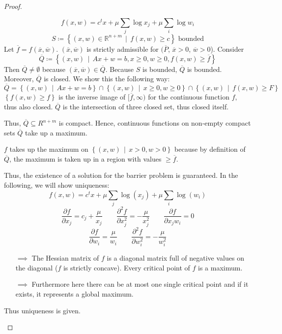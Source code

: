 \documentclass[a4paper]{article}
\numberwithin{lecref}{section}
\newcommand{\Set}[1]{\left\{#1\right\}}
\newcommand{\SetDef}[2]{\left\{#1\,\mid\,#2\right\}}
\begin{document}
\begin{proof}
\begin{description}
			\[ f(x, w) = c^t x + \mu \sum_j \log x_j + \mu \sum_i \log w_i \]
			\[ S \coloneqq \SetDef{(x, w) \in \mathbb R^{n + m}}{f(x, w) \geq c} \text{ bounded} \]
			Let $\overline f = f(\overline x, \overline w)$. $(\overline x, \overline w)$ is strictly admissible for $(\overline P$, $\overline x > 0$, $\overline w > 0$).
			Consider
			\[ \overline Q \coloneqq \SetDef{(x, w)}{Ax + w = b, x \geq 0, w \geq 0, f(x, w) \geq \overline f} \]
			Then $\overline Q \neq \emptyset$ because $(\overline x, \overline w) \in \overline Q$. Because $S$ is bounded, $\overline Q$ is bounded.
			Moreover, $\overline Q$ is closed. We show this the following way:
			\[ \overline Q = \SetDef{(x, w)}{Ax + w = b} \cap \SetDef{(x, w)}{x \geq 0, w \geq 0} \cap \SetDef{(x, w)}{f(x, w) \geq F} \]
			$\Set{f(x, w) \geq f}$ is the inverse image of $[\overline f, \infty)$ for the continuous function $f$, thus also closed.
			$\overline Q$ is the intersection of three closed set, thus closed itself.

			Thus, $\overline Q \subseteq R^{n + m}$ is compact.
			Hence, continuous functions on non-empty compact sets $\overline Q$ take up a maximum.

			$f$ takes up the maximum on $\SetDef{(x, w)}{x > 0, w > 0}$ because by definition of $\overline Q$, the maximum is taken up in a region with values $\geq \overline f$.

			Thus, the existence of a solution for the barrier problem is guaranteed.
			In the following, we will show uniqueness:
			\[ f(x, w) = c^t x + \mu \sum_j \log(x_j) + \mu \sum_i \log(w_i) \]
			\[ \frac{\partial f}{\partial x_j} = c_j + \frac{\mu}{x_j}  \qquad  \frac{\partial^2 f}{\partial x_j^2} = -\frac{\mu}{x_j^2} \qquad \frac{\partial f}{\partial x_j w_i} = 0 \]
			\[ \frac{\partial f}{\partial w_i} = \frac{\mu}{w_i} \qquad \frac{\partial^2 f}{\partial w_i^2} = -\frac{\mu}{w_i^2} \]
			\begin{itemize}
				\item[$\implies$] The Hessian matrix of $f$ is a diagonal matrix full of negative values on the diagonal ($f$ is strictly concave). Every critical point of $f$ is a maximum.
				\item[$\implies$] Furthermore here there can be at most one single critical point and if it exists, it represents a global maximum.
			\end{itemize}
			Thus uniqueness is given.
	\end{description}
\end{proof}
\end{document}
